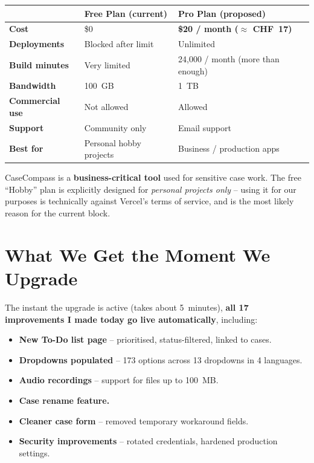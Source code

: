 \documentclass[11pt,a4paper]{article}
\begin{document}
\renewcommand{\arraystretch}{1.4}
\begin{tabularx}{\textwidth}{lXX}
\toprule
 & \textbf{Free Plan (current)} & \textbf{Pro Plan (proposed)} \\
\midrule
\textbf{Cost}              & \$0                    & \textbf{\$20 / month ($\approx$ CHF~17)} \\
\textbf{Deployments}       & Blocked after limit    & Unlimited \\
\textbf{Build minutes}     & Very limited           & 24{,}000 / month (more than enough) \\
\textbf{Bandwidth}         & 100~GB                 & 1~TB \\
\textbf{Commercial use}    & \textcolor{danger}{Not allowed} & \textcolor{success}{Allowed} \\
\textbf{Support}           & Community only         & Email support \\
\textbf{Best for}          & Personal hobby projects & Business / production apps \\
\bottomrule
\end{tabularx}

\vspace{0.5cm}

CaseCompass is a \textbf{business-critical tool} used for sensitive case work. The free ``Hobby'' plan is explicitly designed for \emph{personal projects only} -- using it for our purposes is technically against Vercel's terms of service, and is the most likely reason for the current block.

\section*{What We Get the Moment We Upgrade}

The instant the upgrade is active (takes about 5~minutes), \textbf{all 17 improvements I made today go live automatically}, including:

\begin{itemize}[leftmargin=*]
  \item \textbf{New To-Do list page} -- prioritised, status-filtered, linked to cases.
  \item \textbf{Dropdowns populated} -- 173 options across 13 dropdowns in 4 languages.
  \item \textbf{Audio recordings} -- support for files up to 100~MB.
  \item \textbf{Case rename feature.}
  \item \textbf{Cleaner case form} -- removed temporary workaround fields.
  \item \textbf{Security improvements} -- rotated credentials, hardened production settings.
\end{itemize}
\end{document}
